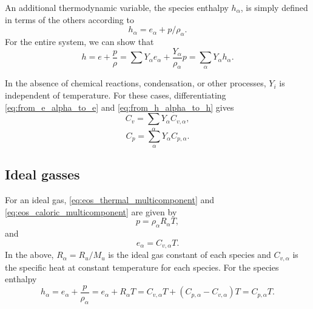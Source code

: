 \documentclass[oneside,a4paper,11pt]{report}
\begin{document}
An additional thermodynamic variable, the species enthalpy $h_\alpha$, is simply defined in terms of the others according to 
\begin{equation}
\label{eq:species_enthalpy}
    h_\alpha = e_\alpha + p / \rho_\alpha.
\end{equation}
For the entire system, we can show that
\begin{equation}
\label{eq:from_h_alpha_to_h}
     h = e + \frac{p}{\rho} = \sum Y_\alpha e_\alpha + \frac{Y_\alpha}{\rho_\alpha} p = \sum_\alpha Y_\alpha h_\alpha.
\end{equation}

In the absence of chemical reactions, condensation, or other processes, $Y_i$ is independent of temperature. For these cases, differentiating \cref{eq:from_e_alpha_to_e} and \cref{eq:from_h_alpha_to_h} gives
\begin{equation}
    C_v = \sum_\alpha Y_\alpha C_{v,\alpha},
\end{equation}
\begin{equation}
    C_p = \sum_\alpha Y_\alpha C_{p,\alpha}.
\end{equation}

\subsection{Ideal gasses}
For an ideal gas, \cref{eq:eos_thermal_multicomponent} and \cref{eq:eos_caloric_multicomponent} are given by
\begin{equation}
\label{eq:eos_thermal_multicomponent_ideal}
p = \rho_\alpha R_\alpha T,
\end{equation}
and
\begin{equation} 
\label{eq:eos_caloric_multicomponent_ideal}
e_\alpha = C_{v,\alpha} T .
\end{equation}
In the above, $R_\alpha = R_u / M_u$ is the ideal gas constant of each species and $C_{v,\alpha}$ is the specific heat at constant temperature for each species. For the species enthalpy 
\begin{equation}
    h_\alpha = e_\alpha + \frac{p}{\rho_\alpha} = e_\alpha + R_\alpha T = C_{v,\alpha} T + \left ( C_{p,\alpha} - C_{v,\alpha} \right ) T = C_{p,\alpha} T.
\end{equation}
\end{document}
